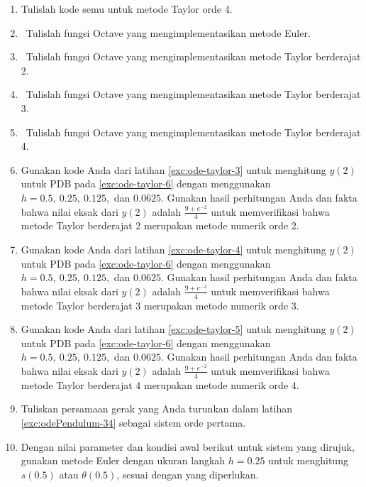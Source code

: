 \begin{enumerate}
\item Tulislah kode semu untuk metode Taylor orde 4.
\item \label{exc:ode-taylor-2} \octave\ Tulislah fungsi Octave yang mengimplementasikan
metode Euler.  \hasasolution 
\item \label{exc:ode-taylor-3} \octave\ Tulislah fungsi Octave yang mengimplementasikan
metode Taylor berderajat 2. \hasananswer 
\item \label{exc:ode-taylor-4} \octave\ Tulislah fungsi Octave yang mengimplementasikan
metode Taylor berderajat 3.
\item \label{exc:ode-taylor-5} \octave\ Tulislah fungsi Octave yang mengimplementasikan
metode Taylor berderajat 4.
\item \label{exc:ode-taylor-12}Gunakan kode Anda dari latihan \ref{exc:ode-taylor-3}
untuk menghitung $y(2)$ untuk PDB pada \ref{exc:ode-taylor-6} dengan
menggunakan $h=0.5,\ 0.25,\ 0.125,$ dan $0.0625$. Gunakan hasil
perhitungan Anda dan fakta bahwa nilai eksak dari $y(2)$ adalah $\frac{9+e^{-2}}{4}$
untuk memverifikasi bahwa metode Taylor berderajat 2 merupakan metode
numerik orde 2. \hasananswer 
\item Gunakan kode Anda dari latihan \ref{exc:ode-taylor-4} untuk menghitung
$y(2)$ untuk PDB pada \ref{exc:ode-taylor-6} dengan menggunakan
$h=0.5,\ 0.25,\ 0.125,$ dan $0.0625$. Gunakan hasil perhitungan
Anda dan fakta bahwa nilai eksak dari $y(2)$ adalah $\frac{9+e^{-2}}{4}$
untuk memverifikasi bahwa metode Taylor berderajat 3 merupakan metode
numerik orde 3.
\item Gunakan kode Anda dari latihan \ref{exc:ode-taylor-5} untuk menghitung
$y(2)$ untuk PDB pada \ref{exc:ode-taylor-6} dengan menggunakan
$h=0.5,\ 0.25,\ 0.125,$ dan $0.0625$. Gunakan hasil perhitungan
Anda dan fakta bahwa nilai eksak dari $y(2)$ adalah $\frac{9+e^{-2}}{4}$
untuk memverifikasi bahwa metode Taylor berderajat 4 merupakan metode
numerik orde 4.
\item \label{exc:ode-taylor-13} Tuliskan persamaan gerak yang Anda turunkan
dalam latihan \ref{exc:odePendulum-34} 
sebagai sistem orde pertama. \haspartwithsolution  \haspartwithanswer 
\item \label{exc:ode-taylor-21}Dengan nilai parameter dan kondisi awal
berikut untuk sistem yang dirujuk, gunakan metode Euler dengan ukuran
langkah $h=0.25$ untuk menghitung $s(0.5)$ atau $\theta(0.5)$,
sesuai dengan yang diperlukan.


\end{enumerate}

